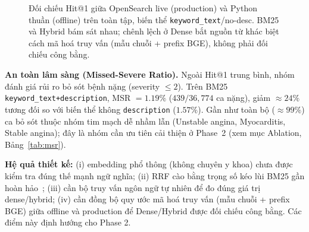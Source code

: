 \begin{figure}[H]
    \centering
    \caption{Đối chiếu Hit@1 giữa OpenSearch live (production) và Python thuần (offline) trên toàn tập, biến thể \texttt{keyword\_text}/no-desc. BM25 và Hybrid bám sát nhau; chênh lệch ở Dense bắt nguồn từ khác biệt cách mã hoá truy vấn (mẫu chuỗi + prefix BGE), không phải đối chiếu công bằng.}
    \label{fig:liveoffline}
\end{figure}

\textbf{An toàn lâm sàng (Missed-Severe Ratio).} Ngoài Hit@1 trung bình, nhóm đánh giá rủi ro bỏ sót bệnh nặng (severity $\le 2$). Trên BM25 \texttt{keyword\_text+description}, MSR $=1.19\%$ ($439/36{,}774$ ca nặng), giảm $\approx 24\%$ tương đối so với biến thể không \texttt{description} ($1.57\%$). Gần như toàn bộ ($\approx 99\%$) ca bỏ sót thuộc nhóm tim mạch dễ nhầm lẫn (Unstable angina, Myocarditis, Stable angina); đây là nhóm cần ưu tiên cải thiện ở Phase~2 (xem mục Ablation, Bảng~\ref{tab:msr}).

\textbf{Hệ quả thiết kế:} (i) embedding phổ thông (không chuyên y khoa) chưa được kiểm tra đúng thế mạnh ngữ nghĩa; (ii) RRF cào bằng trọng số kéo lùi BM25 gần hoàn hảo~\cite{cormack2009rrf}; (iii) cần bộ truy vấn ngôn ngữ tự nhiên để đo đúng giá trị dense/hybrid; (iv) cần đồng bộ quy ước mã hoá truy vấn (mẫu chuỗi + prefix BGE) giữa offline và production để Dense/Hybrid được đối chiếu công bằng. Các điểm này định hướng cho Phase 2.
